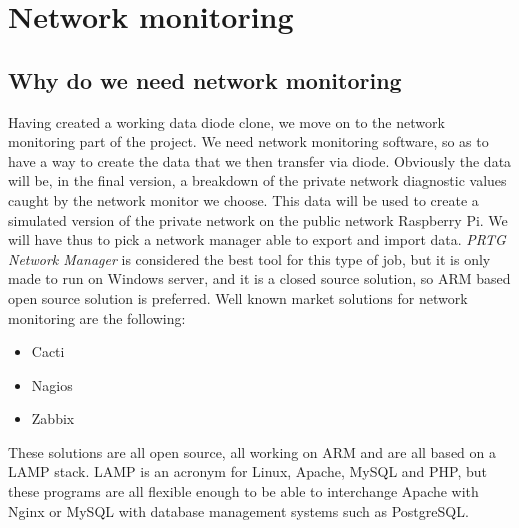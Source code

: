 \documentclass[a4paper, 12pt]{book}
\begin{document}
\section{Network monitoring}
\subsection{Why do we need network monitoring}
Having created a working data diode clone, we move on to the network monitoring part of the project. We need network monitoring software, so as to have a way to create the data that we then transfer via diode. Obviously the data will be, in the final version, a breakdown of the private network diagnostic values caught by the network monitor we choose. This data will be used to create a simulated version of the private network on the public network Raspberry Pi.
We will have thus to pick a network manager able to export and import data. \textit{PRTG Network Manager} is considered the best tool for this type of job, but it is only made to run on Windows server, and it is a closed source solution, so ARM based open source solution is preferred.
Well known market solutions for network monitoring are the following:
\begin{itemize}
    \item Cacti
    \item Nagios
    \item Zabbix
\end{itemize}
These solutions are all open source, all working on ARM and are all based on a LAMP stack. LAMP is an acronym for Linux, Apache, MySQL and PHP, but these programs are all flexible enough to be able to interchange Apache with Nginx or MySQL with database management systems such as PostgreSQL.
\end{document}
